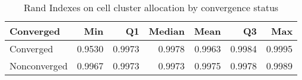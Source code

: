 \begin{table}[ht]
\caption{Rand Indexes on cell cluster allocation by convergence status}
\centering
\begin{tabular}{lrrrrrr}
  \toprule
Converged & Min & Q1 & Median & Mean & Q3 & Max \\ 
  \midrule
Converged & 0.9530 & 0.9973 & 0.9978 & 0.9963 & 0.9984 & 0.9995 \\ 
  Nonconverged & 0.9967 & 0.9973 & 0.9973 & 0.9975 & 0.9978 & 0.9989 \\ 
   \bottomrule
\end{tabular}
\end{table}
